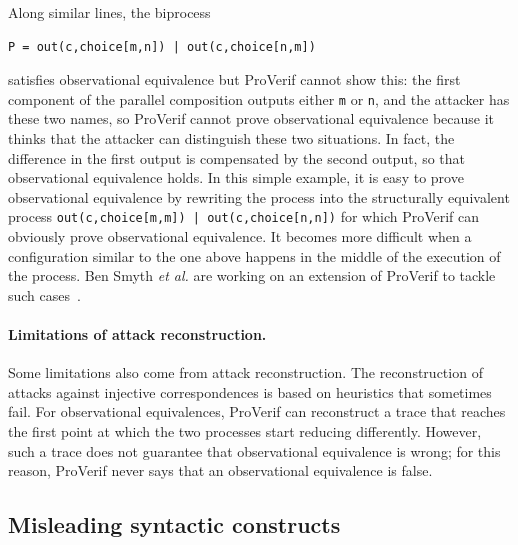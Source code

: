 \documentclass{book}
\begin{document}
Along similar lines, the biprocess
\begin{lstlisting}[numbers=none]
  P = out(c,choice[m,n]) | out(c,choice[n,m])
\end{lstlisting}
satisfies observational equivalence but ProVerif cannot show this: the first
component of the parallel composition outputs either \lstinline!m! or
\lstinline!n!, and the attacker has these two names, so ProVerif
cannot prove observational equivalence because it thinks that the
attacker can distinguish these two situations. In fact, the
difference in the first output is compensated by the second output,
so that observational equivalence holds. In this simple example, it is
easy to prove observational equivalence by rewriting the process into
the structurally equivalent process
%
\lstinline!out(c,choice[m,m]) | out(c,choice[n,n])!
%
for which ProVerif can obviously prove
observational equivalence.  It becomes more difficult when a
configuration similar to the one above happens in the middle of the
execution of the process. Ben Smyth \emph{et al.} are working on an extension
of ProVerif to tackle such cases~\cite{DRS08}.



\paragraph{Limitations of attack reconstruction.}

Some limitations also come from attack reconstruction.
The reconstruction of attacks against injective correspondences
is based on heuristics that sometimes fail.
For observational equivalences, ProVerif can reconstruct a trace
that reaches the first point at which the two processes start
reducing differently. However, such a trace does not guarantee
that observational equivalence is wrong; for this reason,
ProVerif never says that an observational equivalence is false.

\subsection{Misleading syntactic constructs}
\end{document}
